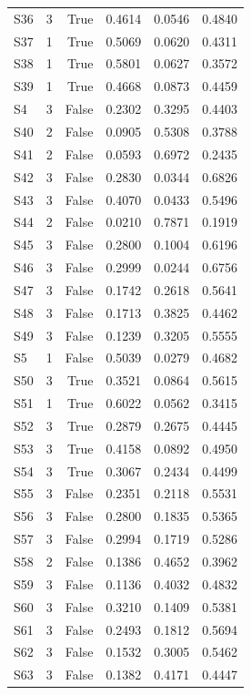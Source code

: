 \begin{longtable}{lrrrrr}
  S36 & 3 & True & 0.4614 & 0.0546 & 0.4840 \\
  S37 & 1 & True & 0.5069 & 0.0620 & 0.4311 \\
  S38 & 1 & True & 0.5801 & 0.0627 & 0.3572 \\
  S39 & 1 & True & 0.4668 & 0.0873 & 0.4459 \\
  S4 & 3 & False & 0.2302 & 0.3295 & 0.4403 \\
  S40 & 2 & False & 0.0905 & 0.5308 & 0.3788 \\
  S41 & 2 & False & 0.0593 & 0.6972 & 0.2435 \\
  S42 & 3 & False & 0.2830 & 0.0344 & 0.6826 \\
  S43 & 3 & False & 0.4070 & 0.0433 & 0.5496 \\
  S44 & 2 & False & 0.0210 & 0.7871 & 0.1919 \\
  S45 & 3 & False & 0.2800 & 0.1004 & 0.6196 \\
  S46 & 3 & False & 0.2999 & 0.0244 & 0.6756 \\
  S47 & 3 & False & 0.1742 & 0.2618 & 0.5641 \\
  S48 & 3 & False & 0.1713 & 0.3825 & 0.4462 \\
  S49 & 3 & False & 0.1239 & 0.3205 & 0.5555 \\
  S5 & 1 & False & 0.5039 & 0.0279 & 0.4682 \\
  S50 & 3 & True & 0.3521 & 0.0864 & 0.5615 \\
  S51 & 1 & True & 0.6022 & 0.0562 & 0.3415 \\
  S52 & 3 & True & 0.2879 & 0.2675 & 0.4445 \\
  S53 & 3 & True & 0.4158 & 0.0892 & 0.4950 \\
  S54 & 3 & True & 0.3067 & 0.2434 & 0.4499 \\
  S55 & 3 & False & 0.2351 & 0.2118 & 0.5531 \\
  S56 & 3 & False & 0.2800 & 0.1835 & 0.5365 \\
  S57 & 3 & False & 0.2994 & 0.1719 & 0.5286 \\
  S58 & 2 & False & 0.1386 & 0.4652 & 0.3962 \\
  S59 & 3 & False & 0.1136 & 0.4032 & 0.4832 \\
  S60 & 3 & False & 0.3210 & 0.1409 & 0.5381 \\
  S61 & 3 & False & 0.2493 & 0.1812 & 0.5694 \\
  S62 & 3 & False & 0.1532 & 0.3005 & 0.5462 \\
  S63 & 3 & False & 0.1382 & 0.4171 & 0.4447 \\

\end{longtable}
